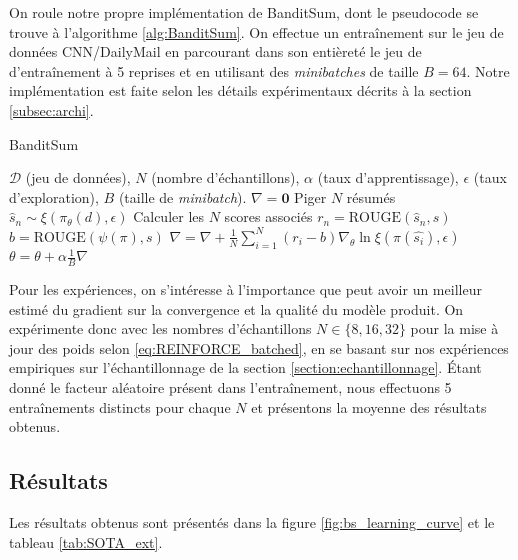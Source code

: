 On roule notre propre implémentation de BanditSum, dont le pseudocode se trouve à l'algorithme 
\ref{alg:BanditSum}.
On effectue un entraînement sur le jeu de données CNN/DailyMail en 
parcourant dans son entièreté le jeu de d'entraînement à 5 reprises
et en utilisant des \textit{minibatches} de taille $B=64$.
Notre implémentation est faite selon les détails expérimentaux décrits à la section 
\ref{subsec:archi}.

\begin{algorithm}
    \caption{BanditSum}
    \begin{algorithmic}[1]
        \Require  $\mathcal{D}$ (jeu de données), $N$ (nombre d'échantillons), $\alpha$ (taux d'apprentissage), $\epsilon$ (taux d'exploration), $B$ (taille de \textit{minibatch}).
         
        \State $\nabla = \mathbf{0}$
        \State Piger $N$ résumés $\hat{s}_n \sim \xi(\pi_\theta(d), \epsilon)$
        \State Calculer les $N$ scores associés $r_n = \text{ROUGE}(\hat{s}_n, s)$
        \State $b = \text{ROUGE}(\psi(\pi), s)$
        \State $\nabla = \nabla + \frac{1}{N} \sum_{i=1}^N (r_i - b) \nabla_\theta \ln \xi \left(\pi(\hat{s_i}), \epsilon \right)$ \Comment{\eqref{eq:REINFORCE_batched}}
        \EndFor
        \State $\theta = \theta + \alpha \frac{1}{B}\nabla$
        \EndWhile
    \end{algorithmic}
    \label{alg:BanditSum}
\end{algorithm}


Pour les expériences, on s'intéresse à
l'importance que peut avoir un meilleur estimé du gradient sur la convergence
et la qualité du modèle produit.
On expérimente donc avec les nombres d'échantillons $N \in \{8, 16, 32\}$
pour la mise à jour des poids selon \eqref{eq:REINFORCE_batched},
en se basant sur nos expériences empiriques sur l'échantillonnage
de la section \ref{section:echantillonnage}.
Étant donné le facteur aléatoire présent dans l'entraînement, nous effectuons 
5 entraînements distincts pour chaque $N$ et présentons la moyenne
des résultats obtenus. 

\subsection{Résultats}

Les résultats obtenus sont présentés dans la figure \ref{fig:bs_learning_curve} 
et le tableau \ref{tab:SOTA_ext}.

